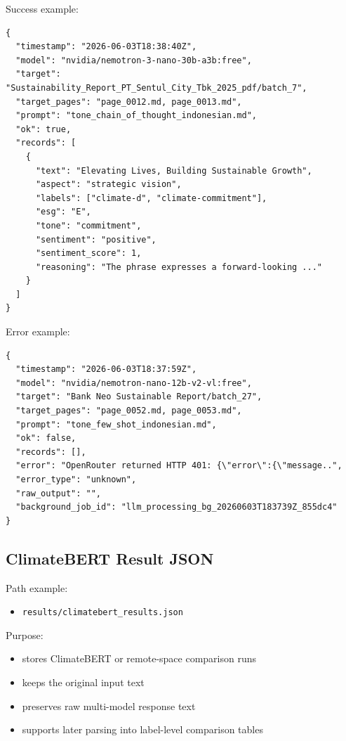 \documentclass[english, online, cse, master]{dithesis}
\providecommand{\tightlist}{\setlength{\itemsep}{0pt}\setlength{\parskip}{0pt}}
\begin{document}
Success example:

\begin{verbatim}
{
  "timestamp": "2026-06-03T18:38:40Z",
  "model": "nvidia/nemotron-3-nano-30b-a3b:free",
  "target": "Sustainability_Report_PT_Sentul_City_Tbk_2025_pdf/batch_7",
  "target_pages": "page_0012.md, page_0013.md",
  "prompt": "tone_chain_of_thought_indonesian.md",
  "ok": true,
  "records": [
    {
      "text": "Elevating Lives, Building Sustainable Growth",
      "aspect": "strategic vision",
      "labels": ["climate-d", "climate-commitment"],
      "esg": "E",
      "tone": "commitment",
      "sentiment": "positive",
      "sentiment_score": 1,
      "reasoning": "The phrase expresses a forward-looking ..."
    }
  ]
}
\end{verbatim}

Error example:

\begin{verbatim}
{
  "timestamp": "2026-06-03T18:37:59Z",
  "model": "nvidia/nemotron-nano-12b-v2-vl:free",
  "target": "Bank Neo Sustainable Report/batch_27",
  "target_pages": "page_0052.md, page_0053.md",
  "prompt": "tone_few_shot_indonesian.md",
  "ok": false,
  "records": [],
  "error": "OpenRouter returned HTTP 401: {\"error\":{\"message..",
  "error_type": "unknown",
  "raw_output": "",
  "background_job_id": "llm_processing_bg_20260603T183739Z_855dc4"
}
\end{verbatim}

\subsection{ClimateBERT Result JSON}\label{climatebert-result-json}

Path example:

\begin{itemize}
\tightlist
\item
  \texttt{results/climatebert\_results.json}
\end{itemize}

Purpose:

\begin{itemize}
\tightlist
\item
  stores ClimateBERT or remote-space comparison runs
\item
  keeps the original input text
\item
  preserves raw multi-model response text
\item
  supports later parsing into label-level comparison tables
\end{itemize}
\end{document}
